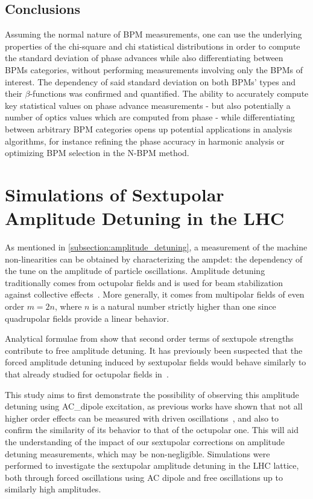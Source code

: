 \subsection*{Conclusions}

Assuming the normal nature of \gls{BPM} measurements, one can use the underlying properties of the chi-square and chi statistical distributions in order to compute the standard deviation of phase advances while also differentiating between BPMs categories, without performing measurements involving only the BPMs of interest.
The dependency of said standard deviation on both BPMs' types and their \(\beta\)-functions was confirmed and quantified.
The ability to accurately compute key statistical values on phase advance measurements - but also potentially a number of optics values which are computed from phase - while differentiating between arbitrary BPM categories opens up potential applications in analysis algorithms, for instance refining the phase accuracy in harmonic analysis or optimizing BPM selection in the N-BPM method.

\section{Simulations of Sextupolar Amplitude Detuning in the LHC}
\label{section:sextupolar_amplitude_detuning}

As mentioned in \cref{subsection:amplitude_detuning}, a measurement of the machine non-linearities can be obtained by characterizing the \gls{ampdet}: the dependency of the tune on the amplitude of particle oscillations.
Amplitude detuning traditionally comes from octupolar fields and is used for beam stabilization against collective effects~\cite{BOOK:Chao:Collective_instabilities,PRAB:Karpov:Thresholds_Loss_Landau_Damping}.
More generally, it comes from multipolar fields of even order \(m = 2n\), where \(n\) is a natural number strictly higher than one since quadrupolar fields provide a linear behavior.

Analytical formulae from \cite{REPORT:Bengtsson:Smear_Tune_Shift, BOOK:Lee:Accelerator_physics,BOOK:Chao:Handbook_Accelerator_Physics_Engineering} show that second order terms of sextupole strengths contribute to free amplitude detuning.
It has previously been suspected that the forced amplitude detuning induced by sextupolar fields would behave similarly to that already studied for octupolar fields in~\cite{PRAB:White:Direct_Amplitude_Detuning_AC_Dipole}.

This study aims to first demonstrate the possibility of observing this amplitude detuning using \gls{AC_dipole} excitation, as previous works have shown that not all higher order effects can be measured with driven oscillations~\cite{PRAB:Persson:Suppression_Amplitude_Dependent_Closest_Tune_Approach}, and also to confirm the similarity of its behavior to that of the octupolar one.
This will aid the understanding of the impact of our sextupolar corrections on amplitude detuning measurements, which may be non-negligible.
Simulations were performed to investigate the sextupolar amplitude detuning in the \gls{LHC} lattice, both through forced oscillations using AC dipole and free oscillations up to similarly high amplitudes.

